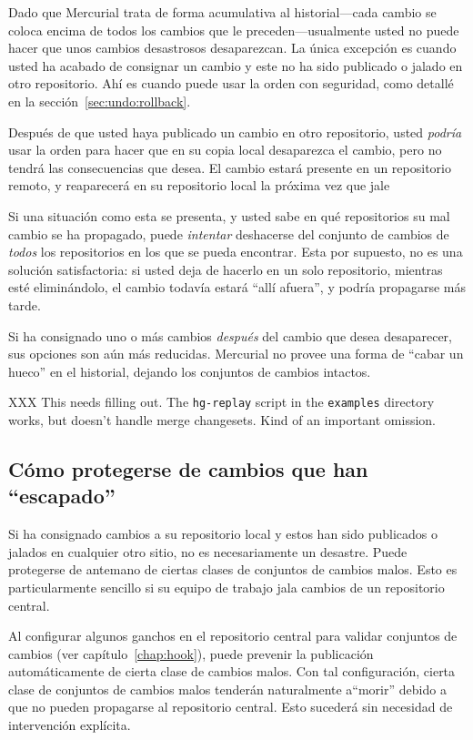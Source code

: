 Dado que Mercurial trata de forma acumulativa al historial---cada
cambio se coloca encima de todos los cambios que le
preceden---usualmente usted no puede hacer que unos cambios desastrosos
desaparezcan. La única excepción es cuando usted ha acabado de
consignar un cambio y este no ha sido publicado o jalado en otro
repositorio. Ahí es cuando puede usar la orden  con
seguridad, como detallé en la sección~\ref{sec:undo:rollback}.

Después de que usted haya publicado un cambio en otro repositorio, usted
\emph{podría} usar la orden  para hacer que en su copia
local desaparezca el cambio, pero no tendrá las consecuencias que
desea. El cambio estará presente en un repositorio remoto, y
reaparecerá en su repositorio local la próxima vez que jale

Si una situación como esta se presenta, y usted sabe en qué
repositorios su mal cambio se ha propagado, puede \emph{intentar}
deshacerse del conjunto de cambios de \emph{todos} los repositorios en
los que se pueda encontrar.  Esta por supuesto, no es una solución
satisfactoria: si usted deja de hacerlo en un solo repositorio,
mientras esté eliminándolo, el cambio todavía estará ``allí afuera'',
y podría propagarse más tarde.

Si ha consignado uno o más cambios \emph{después} del cambio que desea
desaparecer, sus opciones son aún más reducidas. Mercurial no provee
una forma de ``cabar un hueco'' en el historial, dejando los conjuntos
de cambios intactos.


XXX This needs filling out.  The \texttt{hg-replay} script in the
\texttt{examples} directory works, but doesn't handle merge
changesets.  Kind of an important omission.

\subsection{Cómo protegerse de cambios que han ``escapado''}

Si ha consignado cambios a su repositorio local y estos han sido
publicados o jalados en cualquier otro sitio, no es necesariamente un
desastre. Puede protegerse de antemano de ciertas clases de conjuntos
de cambios malos. Esto es particularmente sencillo si su equipo de
trabajo jala cambios de un repositorio central.

Al configurar algunos ganchos en el repositorio central para validar
conjuntos de cambios (ver capítulo~\ref{chap:hook}), puede prevenir la
publicación automáticamente de cierta clase de cambios malos.  Con tal
configuración, cierta clase de conjuntos de cambios malos tenderán
naturalmente a``morir'' debido a que no pueden propagarse al
repositorio central.  Esto sucederá sin necesidad de intervención
explícita.

